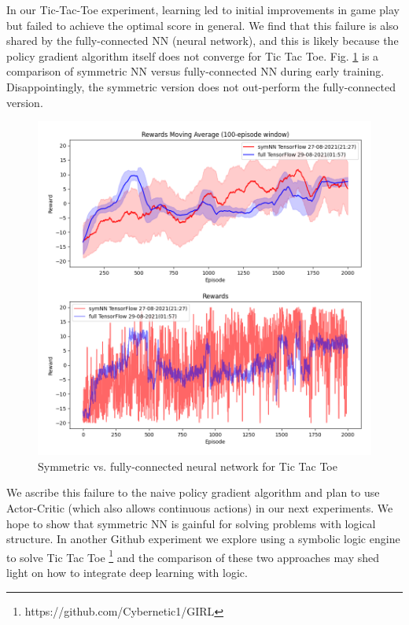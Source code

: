 \documentclass[orivec]{llncs}
\begin{document}
In our Tic-Tac-Toe experiment, learning led to initial improvements in game play but failed to achieve the optimal score in general.  We find that this failure is also shared by the fully-connected NN (neural network), and this is likely because the policy gradient algorithm itself does not converge for Tic Tac Toe.  Fig. \ref{fig:comparison} is a comparison of symmetric NN versus fully-connected NN during early training.  Disappointingly, the symmetric version does not out-perform the fully-connected version.

\begin{figure}[h]
\centering
\includegraphics[scale=0.4]{comparison.png}
\caption{Symmetric vs. fully-connected neural network for Tic Tac Toe}
\label{fig:comparison}
\end{figure}

We ascribe this failure to the naive policy gradient algorithm and plan to use Actor-Critic (which also allows continuous actions) in our next experiments.  We hope to show that symmetric NN is gainful for solving problems with logical structure.  In another Github experiment we explore using a symbolic logic engine to solve Tic Tac Toe \footnote{ https://github.com/Cybernetic1/GIRL } and the comparison of these two approaches may shed light on how to integrate deep learning with logic.
\end{document}
